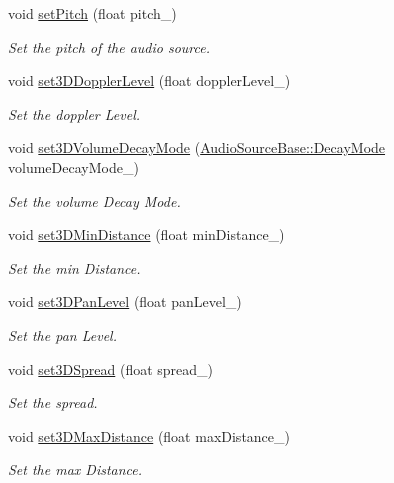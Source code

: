 \begin{DoxyCompactItemize}
void \hyperlink{class_magnum_1_1_audio_source_base_ad958e4a0a91d537faca4a9c9f79fe4f4}{set\+Pitch} (float pitch\+\_\+)
\begin{DoxyCompactList}\small\item\em Set the pitch of the audio source. \end{DoxyCompactList}\item 
void \hyperlink{class_magnum_1_1_audio_source_base_a20381f23a8f187123e8815a9deafb4b9}{set3\+D\+Doppler\+Level} (float doppler\+Level\+\_\+)
\begin{DoxyCompactList}\small\item\em Set the doppler Level. \end{DoxyCompactList}\item 
void \hyperlink{class_magnum_1_1_audio_source_base_a437afc1a3cb83b3c8780f895cf9673bf}{set3\+D\+Volume\+Decay\+Mode} (\hyperlink{class_magnum_1_1_audio_source_base_ab34de5e5b3170a8f0fce85ac723577c9}{Audio\+Source\+Base\+::\+Decay\+Mode} volume\+Decay\+Mode\+\_\+)
\begin{DoxyCompactList}\small\item\em Set the volume Decay Mode. \end{DoxyCompactList}\item 
void \hyperlink{class_magnum_1_1_audio_source_base_a43cbb2cf46f47a800924a8017e910f88}{set3\+D\+Min\+Distance} (float min\+Distance\+\_\+)
\begin{DoxyCompactList}\small\item\em Set the min Distance. \end{DoxyCompactList}\item 
void \hyperlink{class_magnum_1_1_audio_source_base_a696c65f2d5d7c0924e74689859d95082}{set3\+D\+Pan\+Level} (float pan\+Level\+\_\+)
\begin{DoxyCompactList}\small\item\em Set the pan Level. \end{DoxyCompactList}\item 
void \hyperlink{class_magnum_1_1_audio_source_base_a34d62e931fbeeda21cc96d4a75107012}{set3\+D\+Spread} (float spread\+\_\+)
\begin{DoxyCompactList}\small\item\em Set the spread. \end{DoxyCompactList}\item 
void \hyperlink{class_magnum_1_1_audio_source_base_a46615a70206de19f97f07c6d56542c09}{set3\+D\+Max\+Distance} (float max\+Distance\+\_\+)
\begin{DoxyCompactList}\small\item\em Set the max Distance. \end{DoxyCompactList}\item 

\end{DoxyCompactItemize}
